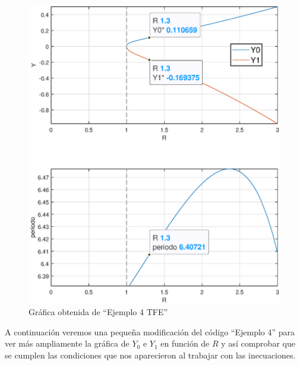 \documentclass[12pt,a4paper]{report} %
\begin{document}
	\begin{figure}[h]
	\centering
	\includegraphics[width=1\textwidth]{ejem4.eps}
	\caption{Gráfica obtenida de ``Ejemplo 4 TFE''}
	\label{fig:ejem4}
	\end{figure}\smallskip
	
	\vspace{0.5cm}\noindent A continuación veremos una pequeña modificación del código ``Ejemplo 4'' para ver más ampliamente la gráfica de $Y_0$ e $Y_1$ en función de $R$ y así comprobar que se cumplen las condiciones que nos aparecieron al trabajar con las inecuaciones.
	
	\newpage
	
	
	
	\newpage
	
\end{document}
